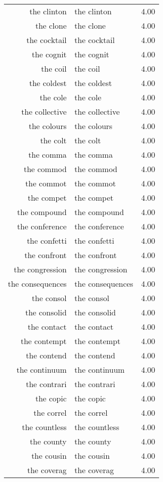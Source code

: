 \begin{table}[ht]
\begin{tabular}{rlr}
  the clinton & the clinton & 4.00 \\ 
  the clone & the clone & 4.00 \\ 
  the cocktail & the cocktail & 4.00 \\ 
  the cognit & the cognit & 4.00 \\ 
  the coil & the coil & 4.00 \\ 
  the coldest & the coldest & 4.00 \\ 
  the cole & the cole & 4.00 \\ 
  the collective & the collective & 4.00 \\ 
  the colours & the colours & 4.00 \\ 
  the colt & the colt & 4.00 \\ 
  the comma & the comma & 4.00 \\ 
  the commod & the commod & 4.00 \\ 
  the commot & the commot & 4.00 \\ 
  the compet & the compet & 4.00 \\ 
  the compound & the compound & 4.00 \\ 
  the conference & the conference & 4.00 \\ 
  the confetti & the confetti & 4.00 \\ 
  the confront & the confront & 4.00 \\ 
  the congression & the congression & 4.00 \\ 
  the consequences & the consequences & 4.00 \\ 
  the consol & the consol & 4.00 \\ 
  the consolid & the consolid & 4.00 \\ 
  the contact & the contact & 4.00 \\ 
  the contempt & the contempt & 4.00 \\ 
  the contend & the contend & 4.00 \\ 
  the continuum & the continuum & 4.00 \\ 
  the contrari & the contrari & 4.00 \\ 
  the copic & the copic & 4.00 \\ 
  the correl & the correl & 4.00 \\ 
  the countless & the countless & 4.00 \\ 
  the county & the county & 4.00 \\ 
  the cousin & the cousin & 4.00 \\ 
  the coverag & the coverag & 4.00 \\ 

\end{tabular}
\end{table}
